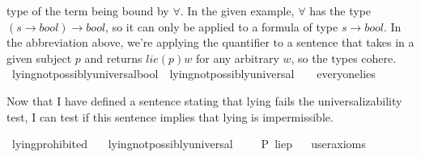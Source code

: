 \begin{isabellebody}
{type of the term being bound by $\forall$. In the given example, 
$\forall$ has the type $(s \rightarrow bool) \rightarrow bool$, so it can only be applied to a formula 
of type $s \rightarrow bool$. In the abbreviation above, we're applying the quantifier to a sentence 
that takes in a given subject $p$ and returns $lie(p) w$ for any arbitrary $w$, so the types cohere.%
}\isanewline
%
\isanewline
\isanewline
{}\isamarkupfalse%
\ lying{\isacharunderscore}not{\isacharunderscore}possibly{\isacharunderscore}universal{\isacharcolon}{\isacharcolon}bool\ \ {\isachardoublequoteopen}lying{\isacharunderscore}not{\isacharunderscore}possibly{\isacharunderscore}universal\ {\isasymequiv}\ {\isasymTurnstile}{\isacharparenleft}\isactrlbold {\isasymnot}\ {\isacharparenleft}{\isasymdiamond}\ everyone{\isacharunderscore}lies{\isacharparenright}{\isacharparenright}{\isachardoublequoteclose}\isanewline
%
%
\begin{isamarkuptext}%
Now that I have defined a sentence stating that lying fails the universalizability test, I can 
      test if this sentence implies that lying is impermissible.%
\end{isamarkuptext}\isamarkuptrue%
\isamarkupfalse%
\ lying{\isacharunderscore}prohibited{\isacharcolon}\isanewline
\ \ \ {\isachardoublequoteopen}lying{\isacharunderscore}not{\isacharunderscore}possibly{\isacharunderscore}universal\ {\isasymlongrightarrow}\ \ {\isacharparenleft}\ {\isasymTurnstile}{\isacharparenleft}\isactrlbold {\isasymnot}\ P\ {\isacharbraceleft}lie{\isacharparenleft}p{\isacharparenright}{\isacharbraceright}{\isacharparenright}{\isacharparenright}{\isachardoublequoteclose}\isanewline
\ \ \isamarkupfalse%
{\isacharbrackleft}user{\isacharunderscore}axioms{\isacharbrackright}%
\isadelimproof
\ %
\endisadelimproof
%
\isatagproof
{}\isamarkupfalse%
\isanewline
%
\end{isabellebody}
